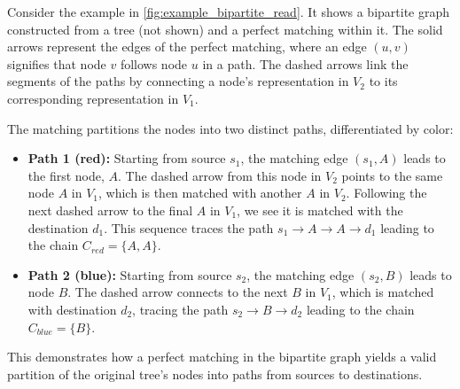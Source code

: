 \begin{example}
    Consider the example in \cref{fig:example_bipartite_read}. It shows a bipartite graph constructed from a tree (not shown) and a perfect matching within it. The solid arrows represent the edges of the perfect matching, where an edge $(u, v)$ signifies that node $v$ follows node $u$ in a path. The dashed arrows link the segments of the paths by connecting a node's representation in $V_2$ to its corresponding representation in $V_1$.

    The matching partitions the nodes into two distinct paths, differentiated by color:
    \begin{itemize}
        \item \textbf{Path 1 (red):} Starting from source $s_1$, the matching edge $(s_1, A)$ leads to the first node, $A$. The dashed arrow from this node in $V_2$ points to the same node $A$ in $V_1$, which is then matched with another $A$ in $V_2$. Following the next dashed arrow to the final $A$ in $V_1$, we see it is matched with the destination $d_1$. This sequence traces the path $s_1 \to A \to A \to d_1$ leading to the chain $C_{red}=\{A,A\}$.
        \item \textbf{Path 2 (blue):} Starting from source $s_2$, the matching edge $(s_2, B)$ leads to node $B$. The dashed arrow connects to the next $B$ in $V_1$, which is matched with destination $d_2$, tracing the path $s_2 \to B \to d_2$ leading to the chain $C_{blue}=\{B\}$.
    \end{itemize}
    This demonstrates how a perfect matching in the bipartite graph yields a valid partition of the original tree's nodes into paths from sources to destinations.
    \begin{figure}[H]
        \centering
\end{figure}
\end{example}
